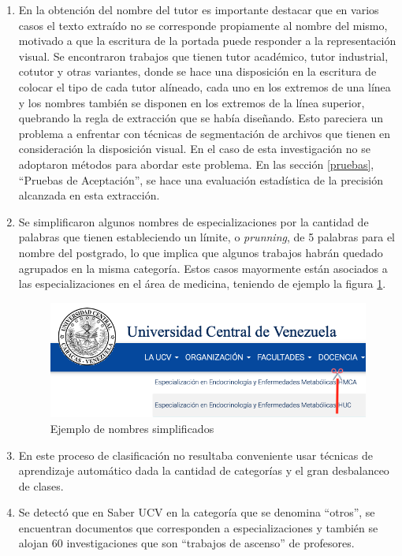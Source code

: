 \documentclass[
  12pt,
  openany]{book}
\begin{document}
\begin{enumerate}
\item
  En la obtención del nombre del tutor es importante destacar que en varios casos el texto extraído no se corresponde propiamente al nombre del mismo, motivado a que la escritura de la portada puede responder a la representación visual. Se encontraron trabajos que tienen tutor académico, tutor industrial, cotutor y otras variantes, donde se hace una disposición en la escritura de colocar el tipo de cada tutor alíneado, cada uno en los extremos de una línea y los nombres también se disponen en los extremos de la línea superior, quebrando la regla de extracción que se había diseñando. Esto pareciera un problema a enfrentar con técnicas de segmentación de archivos que tienen en consideración la disposición visual. En el caso de esta investigación no se adoptaron métodos para abordar este problema. En las sección \ref{pruebas}, ``Pruebas de Aceptación'', se hace una evaluación estadística de la precisión alcanzada en esta extracción.
\item
  Se simplificaron algunos nombres de especializaciones por la cantidad de palabras que tienen estableciendo un límite, o \emph{prunning}, de 5 palabras para el nombre del postgrado, lo que implica que algunos trabajos habrán quedado agrupados en la misma categoría. Estos casos mayormente están asociados a las especializaciones en el área de medicina, teniendo de ejemplo la figura \ref{fig:especial}.

  \begin{figure}

  {\centering \includegraphics[width=0.7\linewidth]{images/05-desarrollo/1_ciclo/especializaciones2} 

  }

  \caption{Ejemplo de nombres simplificados}\label{fig:especial}
  \end{figure}
\item
  En este proceso de clasificación no resultaba conveniente usar técnicas de aprendizaje automático dada la cantidad de categorías y el gran desbalanceo de clases.
\item
  Se detectó que en Saber UCV en la categoría que se denomina ``otros'', se encuentran documentos que corresponden a especializaciones y también se alojan 60 investigaciones que son ``trabajos de ascenso'' de profesores.
\end{enumerate}
\end{document}
